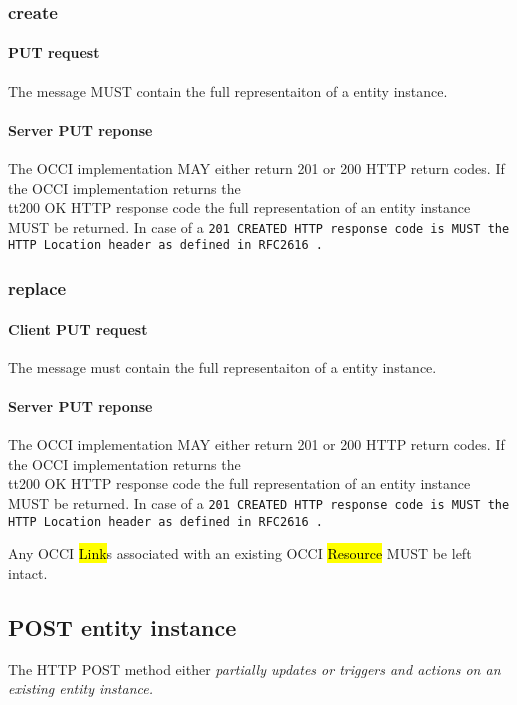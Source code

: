 \documentclass[10pt,a4paper]{article}
\begin{document}
\subsubsection{create}

\paragraph{PUT request}
The message MUST contain the full representaiton of a entity instance.

\paragraph{Server PUT reponse}
The OCCI implementation MAY either return 201 or 200 HTTP return codes. If the OCCI implementation
returns the \\tt{200 OK} HTTP response code the full representation of an entity instance MUST be returned. 
In case of a \tt{201 CREATED} HTTP response code is MUST the HTTP Location header as defined in RFC2616 \cite{?}.

\subsubsection{replace}

\paragraph{Client PUT request}
The message must contain the full representaiton of a entity instance.

\paragraph{Server PUT reponse}
The OCCI implementation MAY either return 201 or 200 HTTP return codes. If the OCCI implementation
returns the \\tt{200 OK} HTTP response code the full representation of an entity instance MUST be returned. 
In case of a \tt{201 CREATED} HTTP response code is MUST the HTTP Location header as defined in RFC2616 \cite{?}.

Any OCCI \hl{Link}s associated with an existing OCCI \hl{Resource} MUST be left intact.

\subsection{POST entity instance}
The HTTP POST method either \em{partially updates} or triggers and \em{actions} on an existing entity instance.
\end{document}
